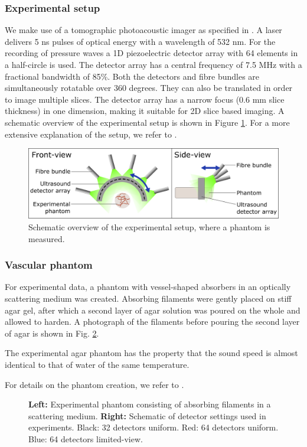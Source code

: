 \documentclass[journal]{IEEEtran}
\newcommand{\hl}[1]{\cbcolor{red}\begin{changebar}{#1}\end{changebar}}
\begin{document}
\subsubsection{Experimental setup}
We make use of a tomographic photoacoustic imager as specified in \cite{Es2015}. A laser delivers 5 ns pulses of optical energy with a wavelength of 532 nm. For the recording of pressure waves a 1D piezoelectric detector array with 64 elements in a half-circle is used. The detector array has a central frequency of 7.5 MHz with a fractional bandwidth of 85\%. Both the detectors and fibre bundles are simultaneously rotatable over 360 degrees. They can also be translated in order to image multiple slices. The detector array has a narrow focus (0.6 mm slice thickness) in one dimension, making it suitable for 2D slice based imaging. A schematic overview of the experimental setup is shown in Figure \ref{fig:exp_setup}. For a more extensive explanation of the setup, we refer to \cite{Es2015}.

\begin{figure}[!ht]
\centering
\includegraphics[width=\linewidth]{images/Experimental_setup4.png}
\caption{Schematic overview of the experimental setup, where a phantom is measured.}
\label{fig:exp_setup}
\end{figure}

\subsubsection{Vascular phantom}
For experimental data, a phantom with vessel-shaped absorbers in an optically scattering medium was created. Absorbing filaments were gently placed on stiff agar gel, after which a second layer of agar solution was poured on the whole and allowed to harden. A photograph of the filaments before pouring the second layer of agar is shown in Fig. \ref{fig:exp_photo}. \hl{The experimental agar phantom has the property that the sound speed is almost identical to that of water of the same temperature.} For details on the phantom creation, we refer to \cite{Boink2018}. 

\begin{figure}[ht!]
\resizebox{\linewidth}{!}{%
\begin{tikzpicture}

\end{tikzpicture}}
\caption{\textbf{Left:} Experimental phantom consisting of absorbing filaments in a scattering medium. \textbf{Right:} Schematic of detector settings used in experiments. Black: 32 detectors uniform. Red: 64 detectors uniform. Blue: 64 detectors limited-view.}
\label{fig:exp_photo}
\end{figure}
\end{document}
